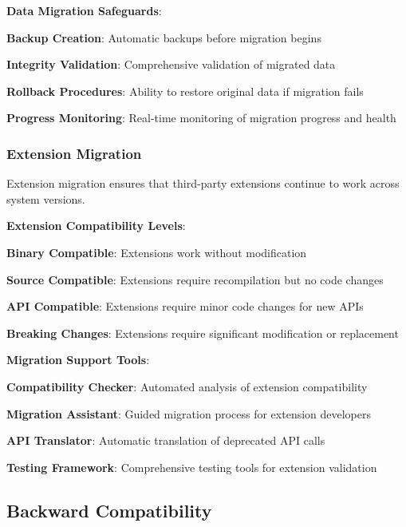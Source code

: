 \textbf{Data Migration Safeguards}:
\begin{compactlist}
    \item \textbf{Backup Creation}: Automatic backups before migration begins
    \item \textbf{Integrity Validation}: Comprehensive validation of migrated data
    \item \textbf{Rollback Procedures}: Ability to restore original data if migration fails
    \item \textbf{Progress Monitoring}: Real-time monitoring of migration progress and health
\end{compactlist}

\subsubsection*{Extension Migration}

Extension migration ensures that third-party extensions continue to work across system versions.

\textbf{Extension Compatibility Levels}:
\begin{compactlist}
    \item \textbf{Binary Compatible}: Extensions work without modification
    \item \textbf{Source Compatible}: Extensions require recompilation but no code changes
    \item \textbf{API Compatible}: Extensions require minor code changes for new APIs
    \item \textbf{Breaking Changes}: Extensions require significant modification or replacement
\end{compactlist}

\textbf{Migration Support Tools}:
\begin{compactlist}
    \item \textbf{Compatibility Checker}: Automated analysis of extension compatibility
    \item \textbf{Migration Assistant}: Guided migration process for extension developers
    \item \textbf{API Translator}: Automatic translation of deprecated API calls
    \item \textbf{Testing Framework}: Comprehensive testing tools for extension validation
\end{compactlist}

\subsection*{Backward Compatibility}

